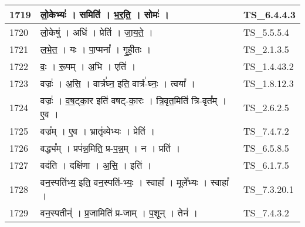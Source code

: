 \documentclass[17pt]{extarticle}
\begin{document}
\begin{longtable}{||p{0.4in}||p{4.9in}||p{0.9in}||}
    \hline
        
    1719 & लो॒केभ्यः॑   ।   समिति॑   ।   भ॒र॒ति॒   ।   सोमः॑   ।    & TS\_6.4.4.3       \\
    
    \hline
        
    1720 & लो॒केषु॑   ।   अधि॑   ।   प्रेति॑   ।   जा॒य॒ते॒   ।    & TS\_5.5.5.4       \\
    
    \hline
        
    1721 & ल॒भे॒त॒   ।   यः   ।   पा॒प्मना᳚   ।   गृ॒ही॒तः   ।    & TS\_2.1.3.5       \\
    
    \hline
        
    1722 & वः॒   ।   रू॒पम्   ।   अ॒भि   ।   एति॑   ।    & TS\_1.4.43.2       \\
    
    \hline
        
    1723 & वज्रः॑   ।   अ॒सि॒   ।   वार्त्र॑घ्न॒ इति॒ वार्त्र॑{-}घ्नः॒   ।   त्वया᳚   ।    & TS\_1.8.12.3       \\
    
    \hline
        
    1724 & वज्रः॑   ।   व॒ष॒ट्का॒र इति॑ वषट्{-}का॒रः   ।   त्रि॒वृत॒मिति॑ त्रि{-}वृत᳚म्   ।   ए॒व   ।    & TS\_2.6.2.5       \\
    
    \hline
        
    1725 & वज्र᳚म्   ।   ए॒व   ।   भ्रातृ॑व्येभ्यः   ।   प्रेति॑   ।    & TS\_7.4.7.2       \\
    
    \hline
        
    1726 & वद्ध्य᳚म्   ।   प्रप॑न्न॒मिति॒ प्र{-}प॒न्न॒म्   ।   न   ।   प्रति॑   ।    & TS\_6.5.8.5       \\
    
    \hline
        
    1727 & वद॑ति   ।   दक्षि॑णा   ।   अ॒सि॒   ।   इति॑   ।    & TS\_6.1.7.5       \\
    
    \hline
        
    1728 & वन॒स्पति॑भ्य॒ इति॒ वन॒स्पति॑{-}भ्यः॒   ।   स्वाहा᳚   ।   मूले᳚भ्यः   ।   स्वाहा᳚   ।    & TS\_7.3.20.1       \\
    
    \hline
        
    1729 & वन॒स्पतीन्॑   ।   प्र॒जामिति॑ प्र{-}जाम्   ।   प॒शून्   ।   तेन॑   ।    & TS\_7.4.3.2       \\
    

\end{longtable}
\end{document}
